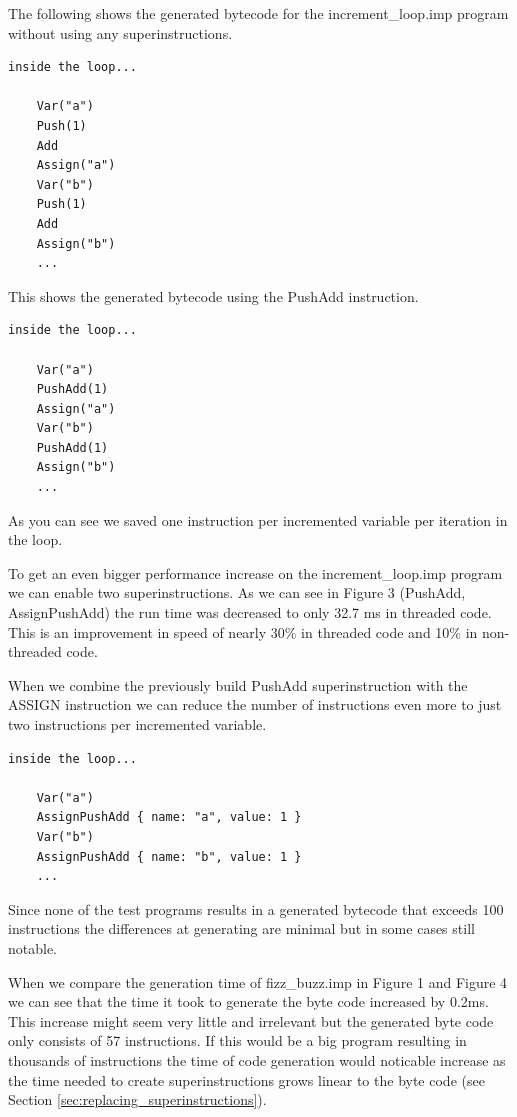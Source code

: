 \documentclass{article}
\begin{document}
The following shows the generated bytecode for the increment\_loop.imp program
without using any superinstructions.
\begin{verbatim}
inside the loop...

    Var("a")
    Push(1)
    Add
    Assign("a")
    Var("b")
    Push(1)
    Add
    Assign("b")
    ...
\end{verbatim}

This shows the generated bytecode using the PushAdd instruction.
\begin{verbatim}
inside the loop...

    Var("a")
    PushAdd(1)
    Assign("a")
    Var("b")
    PushAdd(1)
    Assign("b")
    ...
\end{verbatim}

As you can see we saved one instruction per incremented variable per
iteration in the loop. 

To get an even bigger performance increase on the increment\_loop.imp program
we can enable two superinstructions. As we can see in Figure 3 (PushAdd,
AssignPushAdd) the run time was decreased to only 32.7 ms in threaded code.
This is an improvement in speed of nearly 30\% in threaded code and 10\% in
non-threaded code.

When we combine the previously build PushAdd superinstruction with the ASSIGN
instruction we can reduce the number of instructions even more to just two
instructions per incremented variable.

\begin{verbatim}
inside the loop...

    Var("a")
    AssignPushAdd { name: "a", value: 1 }
    Var("b")
    AssignPushAdd { name: "b", value: 1 }
    ...
\end{verbatim}

Since none of the test programs results in a generated bytecode that exceeds
100 instructions the differences at generating are minimal but in some cases
still notable.

When we compare the generation time of fizz\_buzz.imp in Figure 1 and Figure 4
we can see that the time it took to generate the byte code increased by 0.2ms.
This increase might seem very little and irrelevant but the generated byte code
only consists of 57 instructions. If this would be a big program resulting in
thousands of instructions the time of code generation would noticable increase
as the time needed to create superinstructions grows linear to the byte code
(see Section \ref{sec:replacing_superinstructions}).
\end{document}
